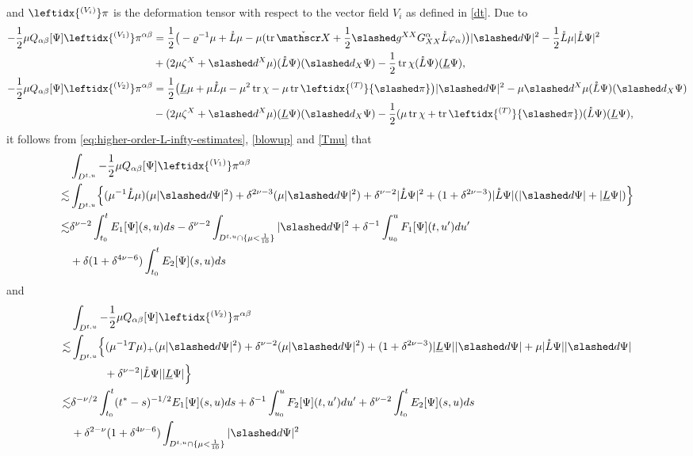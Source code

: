 \documentclass[11pt,twoside]{article}
\def\al{\alpha}
\def\vp{\varphi}
\def\f{\frac}
\begin{document}
and $\leftidx{^{(V_i)}}\pi$ is the deformation tensor with respect to the vector field $V_i$ as defined in \eqref{dt}.
Due to
\begin{align*}
-\frac{1}{2} \mu Q_{\al\beta}[\Psi]\leftidx{^{(V_1)}}\pi^{\al\beta}&= \frac{1}{2}\big(- \varrho^{-1}\mu+\mathring L\mu-\mu(\operatorname{tr}\check{\mathscr X}+\f12\slashed g^{XX}G_{XX}^{\al}\mathring L\vp_\al)\big)|\slashed d\Psi|^2 -\f12\mathring L\mu|\mathring L\Psi|^2\\
&+(2\mu\zeta^X+\slashed d^X\mu)(\mathring L\Psi)(\slashed d_X\Psi)-\f12\operatorname{tr}\chi(\mathring L\Psi)(\underline L\Psi),\\
-\frac{1}{2} \mu Q_{\al\beta}[\Psi]\leftidx{^{(V_2)}}\pi^{\al\beta} &= \frac{1}{2}\big(\underline L\mu+\mu\mathring L\mu-\mu^2\operatorname{tr}\chi-\mu\operatorname{tr}\leftidx{^{(T)}}{\slashed\pi}\big)|\slashed d\Psi|^2 -\mu\slashed d^X\mu(\mathring L\Psi)(\slashed d_X\Psi)\\
&-(2\mu\zeta^X+\slashed d^X\mu)(\underline L\Psi)(\slashed d_X\Psi)-\f12(\mu\operatorname{tr}\chi+\operatorname{tr}\leftidx{^{(T)}}{\slashed\pi})(\mathring L\Psi)(\underline L\Psi),
\end{align*}
it follows from \eqref{eq:higher-order-L-infty-estimates}, \eqref{blowup} and \eqref{Tmu} that
\begin{align}
&\int_{D^{t, u}}-\frac{1}{2} \mu Q_{\al\beta}[\Psi]\leftidx{^{(V_1)}}\pi^{\al\beta}\nonumber\\
\lesssim&\int_{D^{t, u}}\Bigl\{(\mu^{-1}\mathring L\mu)(\mu|\slashed d\Psi|^2)+\delta^{2\nu-3}(\mu|\slashed d\Psi|^2)+\delta^{\nu-2}|\mathring L\Psi|^2+(1+\delta^{2\nu-3})|\mathring L\Psi|(|\slashed d\Psi|+|\underline L\Psi|)\Bigr\}\nonumber\\
\lesssim&\delta^{\nu-2}\int_{t_0}^tE_1[\Psi](s,u)ds-\delta^{\nu-2}\int_{D^{t, u}\cap\{\mu<\f{1}{10}\}}|\slashed d\Psi|^2+\delta^{-1}\int_{u_0}^uF_1[\Psi](t,u')du'\label{QV1}\\
&+\delta(1+\delta^{4\nu-6})\int_{t_0}^tE_2[\Psi](s,u)ds
\nonumber
\end{align}
and
\begin{align}
&\int_{D^{t, u}}-\frac{1}{2} \mu Q_{\al\beta}[\Psi]\leftidx{^{(V_2)}}\pi^{\al\beta}\nonumber\\
\lesssim&\int_{D^{t, u}}\Bigl\{(\mu^{-1}T\mu)_+(\mu|\slashed d\Psi|^2)+\delta^{\nu-2}(\mu|\slashed d\Psi|^2)+(1+\delta^{2\nu-3})|\underline L\Psi||\slashed d\Psi|+\mu|\mathring L\Psi||\slashed d\Psi|\nonumber\\
&\qquad\quad+\delta^{\nu-2}|\mathring L\Psi||\underline L\Psi|\Bigr\}\nonumber\\
\lesssim&\delta^{-\nu/2}\int_{t_0}^t(t^*-s)^{-1/2}E_1[\Psi](s,u)ds+\delta^{-1}\int_{u_0}^uF_2[\Psi](t,u')du'+\delta^{\nu-2}\int_{t_0}^tE_2[\Psi](s,u)ds\label{QV2}\\
&+\delta^{2-\nu}(1+\delta^{4\nu-6})\int_{D^{t, u}\cap\{\mu<\f{1}{10}\}}|\slashed d\Psi|^2\nonumber
\end{align}
\end{document}
